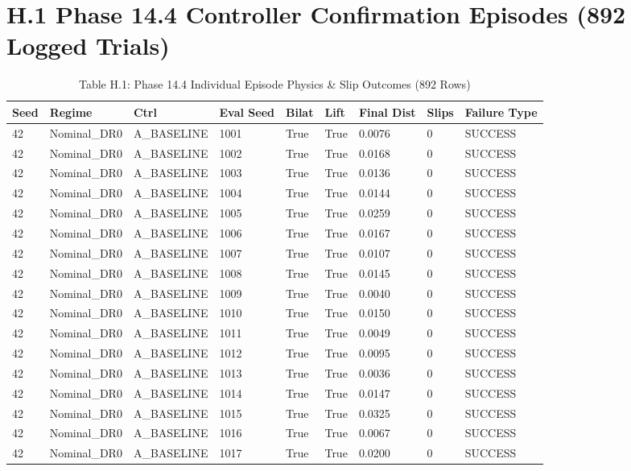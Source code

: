 \documentclass[11pt,a4paper,oneside]{book}
\begin{document}
\section{H.1 Phase 14.4 Controller Confirmation Episodes (892 Logged Trials)}
\begin{longtable}{l l l l l l l l l}\caption{Table H.1: Phase 14.4 Individual Episode Physics \& Slip Outcomes (892 Rows)}\\\toprule
Seed & Regime & Ctrl & Eval Seed & Bilat & Lift & Final Dist & Slips & Failure Type \\ \midrule \endhead
42 & Nominal\_DR0 & A\_BASELINE & 1001 & True & True & 0.0076 & 0 & SUCCESS \\
42 & Nominal\_DR0 & A\_BASELINE & 1002 & True & True & 0.0168 & 0 & SUCCESS \\
42 & Nominal\_DR0 & A\_BASELINE & 1003 & True & True & 0.0136 & 0 & SUCCESS \\
42 & Nominal\_DR0 & A\_BASELINE & 1004 & True & True & 0.0144 & 0 & SUCCESS \\
42 & Nominal\_DR0 & A\_BASELINE & 1005 & True & True & 0.0259 & 0 & SUCCESS \\
42 & Nominal\_DR0 & A\_BASELINE & 1006 & True & True & 0.0167 & 0 & SUCCESS \\
42 & Nominal\_DR0 & A\_BASELINE & 1007 & True & True & 0.0107 & 0 & SUCCESS \\
42 & Nominal\_DR0 & A\_BASELINE & 1008 & True & True & 0.0145 & 0 & SUCCESS \\
42 & Nominal\_DR0 & A\_BASELINE & 1009 & True & True & 0.0040 & 0 & SUCCESS \\
42 & Nominal\_DR0 & A\_BASELINE & 1010 & True & True & 0.0150 & 0 & SUCCESS \\
42 & Nominal\_DR0 & A\_BASELINE & 1011 & True & True & 0.0049 & 0 & SUCCESS \\
42 & Nominal\_DR0 & A\_BASELINE & 1012 & True & True & 0.0095 & 0 & SUCCESS \\
42 & Nominal\_DR0 & A\_BASELINE & 1013 & True & True & 0.0036 & 0 & SUCCESS \\
42 & Nominal\_DR0 & A\_BASELINE & 1014 & True & True & 0.0147 & 0 & SUCCESS \\
42 & Nominal\_DR0 & A\_BASELINE & 1015 & True & True & 0.0325 & 0 & SUCCESS \\
42 & Nominal\_DR0 & A\_BASELINE & 1016 & True & True & 0.0067 & 0 & SUCCESS \\
42 & Nominal\_DR0 & A\_BASELINE & 1017 & True & True & 0.0200 & 0 & SUCCESS \\

\end{longtable}
\end{document}
